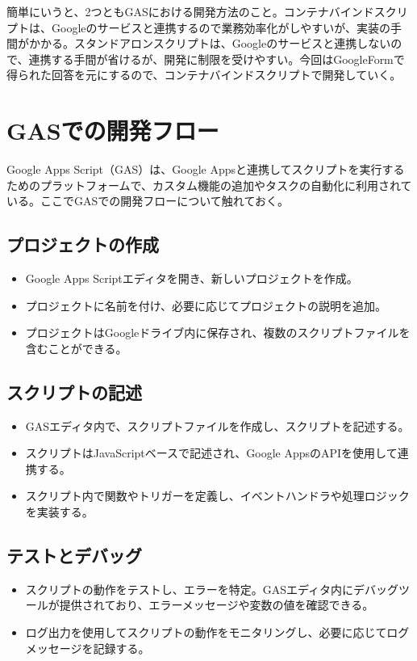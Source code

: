 \documentclass{jsarticle}
\begin{document}
\par 簡単にいうと、2つともGASにおける開発方法のこと。コンテナバインドスクリプトは、Googleのサービスと連携するので業務効率化がしやすいが、実装の手間がかかる。スタンドアロンスクリプトは、Googleのサービスと連携しないので、連携する手間が省けるが、開発に制限を受けやすい。今回はGoogleFormで得られた回答を元にするので、コンテナバインドスクリプトで開発していく。

\section{GASでの開発フロー}
Google Apps Script（GAS）は、Google Appsと連携してスクリプトを実行するためのプラットフォームで、カスタム機能の追加やタスクの自動化に利用されている。ここでGASでの開発フローについて触れておく。

\subsection{プロジェクトの作成}
\begin{itemize}
    \item Google Apps Scriptエディタを開き、新しいプロジェクトを作成。
    \item プロジェクトに名前を付け、必要に応じてプロジェクトの説明を追加。
    \item プロジェクトはGoogleドライブ内に保存され、複数のスクリプトファイルを含むことができる。
\end{itemize}

\subsection{スクリプトの記述}
\begin{itemize}
    \item GASエディタ内で、スクリプトファイルを作成し、スクリプトを記述する。
    \item スクリプトはJavaScriptベースで記述され、Google AppsのAPIを使用して連携する。
    \item スクリプト内で関数やトリガーを定義し、イベントハンドラや処理ロジックを実装する。
\end{itemize}

\subsection{テストとデバッグ}
\begin{itemize}
    \item スクリプトの動作をテストし、エラーを特定。GASエディタ内にデバッグツールが提供されており、エラーメッセージや変数の値を確認できる。
    \item ログ出力を使用してスクリプトの動作をモニタリングし、必要に応じてログメッセージを記録する。
\end{itemize}
\end{document}

